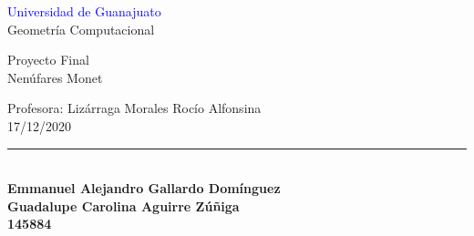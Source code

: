 \documentclass[11pt,a4paper]{article}
\begin{document}
\begin{center}

\textcolor{blue}{Universidad de Guanajuato}\\
Geometría Computacional\\
\begin{large}
Proyecto Final\\
Nenúfares Monet\\

\end{large}
Profesora: Lizárraga Morales Rocío Alfonsina\\
17/12/2020\\
\rule{70mm}{.1mm}\\
\bf{Emmanuel Alejandro Gallardo Domínguez}\\
\bf{Guadalupe Carolina Aguirre Zúñiga}\\
145884\\

\end{center}
\end{document}
